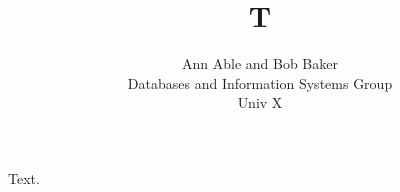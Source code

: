 \documentclass{article}
\begin{document}
\title{T}
\author{Ann Able and Bob Baker\\ Databases and Information Systems Group\\ Univ X}
\maketitle
Text.
\end{document}
